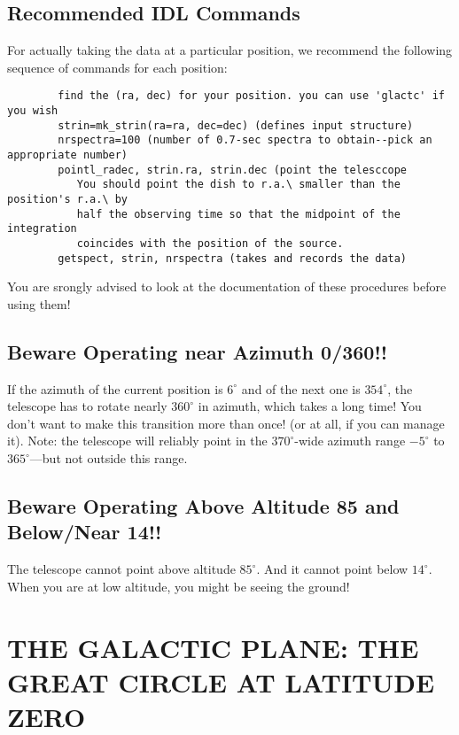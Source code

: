 \documentclass[psfig,preprint]{aastex}
\begin{document}
\subsection{Recommended IDL Commands} \label{mappingcommands}

For actually taking the data at a particular position, we recommend the
following sequence of commands for each position:
\begin{verbatim}
        find the (ra, dec) for your position. you can use 'glactc' if you wish
        strin=mk_strin(ra=ra, dec=dec) (defines input structure)
        nrspectra=100 (number of 0.7-sec spectra to obtain--pick an appropriate number)
        pointl_radec, strin.ra, strin.dec (point the telesccope
           You should point the dish to r.a.\ smaller than the position's r.a.\ by
           half the observing time so that the midpoint of the integration
           coincides with the position of the source.
        getspect, strin, nrspectra (takes and records the data)
\end{verbatim}
\noindent You are srongly advised to look at the documentation of these procedures before using them!

\subsection{Beware Operating near Azimuth 0/360!!}

If the azimuth of the current position is $6^\circ$ and of the next one
is $354^\circ$, the telescope has to rotate nearly $360^\circ$ in azimuth,
which takes a long time! You don't want to make this transition more
than once! (or at all, if you can manage it). Note: the telescope will
reliably point in the $370^\circ$-wide azimuth range $-5^\circ$ to
$365^\circ$---but not outside this range.

\subsection{Beware Operating Above Altitude 85 and Below/Near 14!!}

The telescope cannot point above altitude $85^\circ$. And it cannot
point below $14^\circ$. When you are at low altitude, you might be
seeing the ground!

\section{THE GALACTIC PLANE: THE GREAT CIRCLE AT LATITUDE ZERO 
} 
\label{galacticplane}
\end{document}
